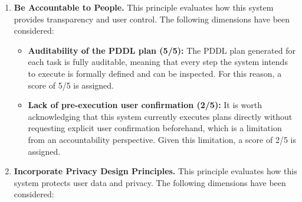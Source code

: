 \begin{enumerate}
\begin{itemize}
        \item \textbf{Controlled action space (PDDL templates) (5/5):} The use of
        predefined PDDL task templates means this system can only execute a
        controlled and well-defined set of actions, preventing it from taking
        arbitrary or unexpected steps outside of its intended scope. This is a
        deliberate architectural decision that significantly reduces the risk of
        unintended or harmful behaviour, therefore a score of 5/5 is assigned.

        \item \textbf{Least-privilege principle per agent (5/5):} Each agent in
        the pipeline only has access to what is strictly necessary for its specific
        task. This is why, there are 8 agents in the pipeline, despite being a high
        number, this was thought from the beginning of the project, before the
        development of the system, to ensure that no agent could do more than the
        necessary actions. Therefore, a 5/5 is assigned, due to the security by
        design implementation.
    \end{itemize}

    \item \textbf{Be Accountable to People.} This principle evaluates how this
    system provides transparency and user control. The following dimensions have
    been considered:

    \begin{itemize}
        \item \textbf{Auditability of the PDDL plan (5/5):} The PDDL plan generated
        for each task is fully auditable, meaning that every step the system intends
        to execute is formally defined and can be inspected. For this reason, a
        score of 5/5 is assigned.

        \item \textbf{Lack of pre-execution user confirmation (2/5):} It is worth
        acknowledging that this system currently executes plans directly without
        requesting explicit user confirmation beforehand, which is a limitation from
        an accountability perspective. Given this limitation, a score of 2/5 is
        assigned.
    \end{itemize}

    \item \textbf{Incorporate Privacy Design Principles.} This principle evaluates
    how this system protects user data and privacy. The following dimensions have
    been considered:


\end{enumerate}

